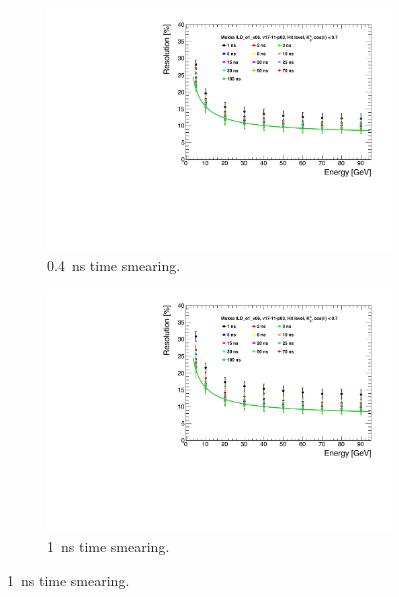 \begin{figure}[htbp!]
  \centering
  \begin{minipage}{1\textwidth}
    \begin{subfigure}[t]{0.5\textwidth}
      \centering
      \includegraphics[width=1\linewidth]{chap6/fig_TimingILD/0.4ns_Smearing/ShowerResoAbsolute_TimeCuts_Smearing0.4ns}
      \caption{\SI{0.4}{\nano\second} time smearing.} \label{fig:Reso0.4ns}
    \end{subfigure}
    \begin{subfigure}[t]{0.5\textwidth}
      \centering
      \includegraphics[width=1\linewidth]{chap6/fig_TimingILD/1ns_Smearing/ShowerResoAbsolute_TimeCuts_Smearing1ns}
      \caption{\SI{1}{\nano\second} time smearing.} \label{fig:Reso1ns}
    \end{subfigure}

\end{minipage}
\end{figure}

